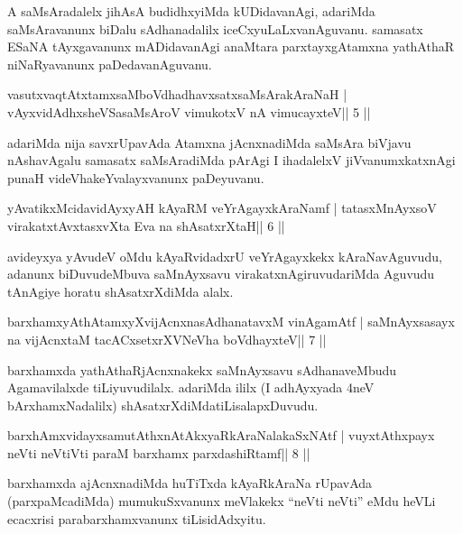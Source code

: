 \begin{artha}
A saMsAradalelx jihAsA budidhxyiMda kUDidavanAgi, adariMda
saMsAravanunx biDalu sAdhanadalilx iceCxyuLaLxvanAguvanu.
samasatx ESaNA tAyxgavanunx mADidavanAgi anaMtara parxtayxgAtamxna
yathAthaR niNaRyavanunx paDedavanAguvanu. 
\end{artha}

\begin{shl}
vasutxvaqtAtxtamxsaMboVdhadhavxsatxsaMsArakAraNaH |
vAyxvidAdhxsheVSasaMsAroV vimukotxV nA vimucayxteV\hfill || 5 ||
\end{shl}

\begin{artha}
adariMda nija savxrUpavAda Atamxna jAcnxnadiMda saMsAra biVjavu
nAshavAgalu samasatx saMsAradiMda pArAgi I ihadalelxV jiVvanumxkatxnAgi
punaH videVhakeYvalayxvanunx paDeyuvanu. 
\end{artha}

\begin{shl}
yAvatikxMcidavidAyxyAH kAyaRM veYrAgayxkAraNamf |
tatasxMnAyxsoV virakatxtAvxtasxvXta Eva na shAsatxrXtaH\hfill || 6 ||
\end{shl}

\begin{artha}
avideyxya yAvudeV oMdu kAyaRvidadxrU veYrAgayxkekx kAraNavAguvudu, adanunx biDuvudeMbuva saMnAyxsavu virakatxnAgiruvudariMda Aguvudu tAnAgiye horatu shAsatxrXdiMda alalx.
\end{artha}

\begin{shl}
barxhamxyAthAtamxyXvijAcnxnasAdhanatavxM vinA\s\s gamAtf |
saMnAyxsasayx na vijAcnxtaM tacACxsetxrXVNeVha boVdhayxteV\hfill || 7 ||
\end{shl}

\begin{artha}
barxhamxda yathAthaRjAcnxnakekx saMnAyxsavu sAdhanaveMbudu Agamavilalxde tiLiyuvudilalx. adariMda ililx (I adhAyxyada 4neV bArxhamxNadalilx) shAsatxrXdiMda\break tiLisalapxDuvudu.
\end{artha}


\begin{shl}
barxhAmxvidayxsamutAthxnAtAkxyaRkAraNalakaSxNAtf |
vuyxtAthxpayx neVti neVtiVti paraM barxhamx parxdashiRtamf\hfill || 8 ||
\end{shl}

\begin{artha}
barxhamxda ajAcnxnadiMda huTiTxda kAyaRkAraNa rUpavAda (parxpaMcadiMda) mumukuSxvanunx meVlakekx ``neVti neVti'' eMdu heVLi ecacxrisi parabarxhamxvanunx tiLisidAdxyitu.
\end{artha}

